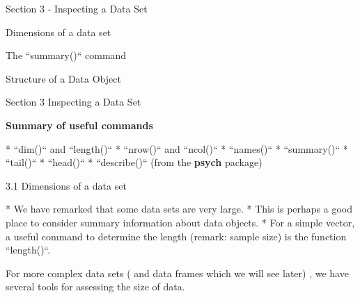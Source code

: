 \documentclass{beamer}
\begin{document}

{Section 3 - Inspecting a Data Set }

\item[3.1] Dimensions of a data set 
\item[3.2] The ``summary()`` command   
\item[3.3] Structure of a Data Object 


%
%
%
% 
%
%
%
%


{Section 3 Inspecting a Data Set}
 
\textbf{Summary of useful commands}

* ``dim()`` and ``length()``
* ``nrow()`` and ``ncol()``
* ``names()``
* ``summary()``
* ``tail()``
* ``head()``
* ``describe()`` (from the \textbf{psych} package)




{3.1 Dimensions of a data set}

* We have remarked that some data sets are very large. 
* This is perhaps a good place to consider
summary information about data objects. 
* For a simple vector, a useful command to determine
the length (remark: sample size) is the function ``length()``.

\begin{framed}
``Y=4:18}
``length(Y)}

\end{framed}
For more complex data sets ( and data frames which we will see later) , we have several
tools for assessing the size of data.

\end{document}
